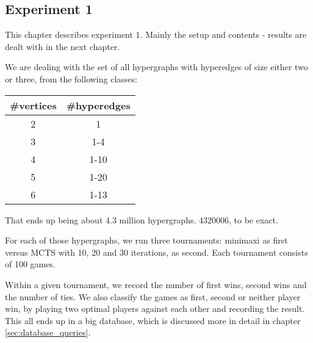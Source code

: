 
\subsection{Experiment 1}


This chapter describes experiment 1. Mainly the setup and contents - results are dealt with in the next chapter.

We are dealing with the set of all hypergraphs with hyperedges of size either two or three, from the following classes:

\begin{tabular}{ c | c }
\#vertices & \#hyperedges \\ \hline
2&1 \\ \hline
3&1-4 \\ \hline
4&1-10 \\ \hline
5&1-20 \\ \hline
6&1-13 \\ \hline
\end{tabular}


That ends up being about 4.3 million hypergraphs. 4320006, to be exact.

For each of those hypergraphs, we run three tournaments: minimaxi as first versus MCTS with 10, 20 and 30 iterations, as second.
Each tournament consists of 100 games.

Within a given tournament, we record the number of first wins, second wins and the number of ties.
We also classify the games as first, second or neither player win, by playing two optimal players against each other and recording the result.
This all ends up in a big database, which is discussed more in detail in chapter \ref{sec:database_queries}.
